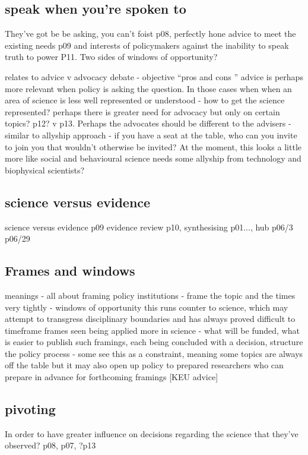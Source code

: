 \subsection{speak when you're spoken to}
They've got be be asking, you can't foist p08, perfectly hone advice to meet the existing needs p09 and interests of policymakers against the inability to speak truth to power P11. Two sides of windows of opportunity?

relates to advice v advocacy debate - objective ``pros and cons '' advice is perhaps more relevant when policy is asking the question. In those cases when when an area of science is less well represented or understood - how to get the science represented? perhaps there is greater need for advocacy but only on certain topics? p12? v p13. Perhaps the advocates should be different to the advisers - similar to allyship approach - if you have a seat at the table, who can you invite to join you that wouldn't otherwise be invited? At the moment, this looks a little more like social and behavioural science needs some allyship from technology and biophysical scientists?





\subsection{science versus evidence}
science versus evidence p09
evidence review p10, synthesising p01..., hub p06/3 p06/29

\subsection{Frames and windows}
meanings - all about framing
policy institutions - frame the topic and the times very tightly - windows of opportunity
this runs counter to science, which may attempt to transgress disciplinary boundaries and has always proved difficult to timeframe
frames seen being applied more in science - what will be funded, what is easier to publish
such framings, each being concluded with a decision, structure the policy process
- some see this as a constraint, meaning some topics are always off the table but it may also open up policy to prepared researchers who can prepare in advance for forthcoming framings [KEU advice]

\subsection{pivoting}
In order to have greater influence on decisions regarding the science that they've observed?
p08, p07, ?p13

